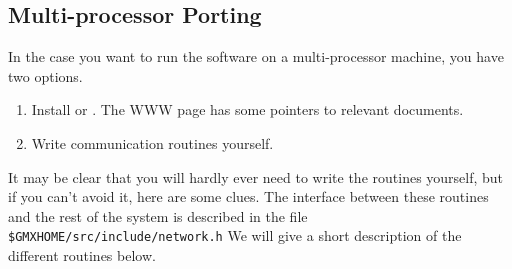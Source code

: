 \subsection{Multi-processor Porting}

In the case you want to run the {\gromacs} software on a
multi-processor machine, you have two options.
\begin{enumerate}
\item	Install  or . The {\gromacs} WWW
	page has some pointers to relevant documents.
\item	Write communication routines yourself. 
\end{enumerate}

It may be clear that you will hardly ever need to write the routines
yourself, but if you can't avoid it, here are some clues.
The interface between these routines and the
rest of the {\gromacs} system is described in the file {\tt
\$GMXHOME/src/include/network.h} We will give a short description of the
different routines below.

